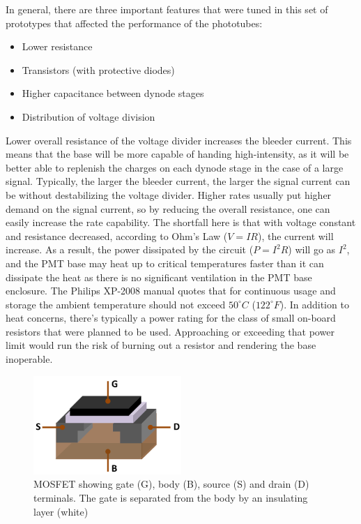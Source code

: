 In general, there are three important features that were tuned in this set of prototypes that affected the performance of the phototubes:
\begin{itemize}
	\item
	Lower resistance
	\item
	Transistors (with protective diodes)
	\item
	Higher capacitance between dynode stages
	\item
	Distribution of voltage division
\end{itemize}

Lower overall resistance of the voltage divider increases the bleeder current. This means that the base will be more capable of handing high-intensity, as it will be better able to replenish the charges on each dynode stage in the case of a large signal. Typically, the larger the bleeder current, the larger the signal current can be without destabilizing the voltage divider. Higher rates usually put higher demand on the signal current, so by reducing the overall resistance, one can easily increase the rate capability. The shortfall here is that with voltage constant and resistance decreased, according to Ohm's Law ($V = IR$), the current will increase. As a result, the power dissipated by the circuit ($P = I^2 R$) will go as $I^2$, and the PMT base may heat up to critical temperatures faster than it can dissipate the heat as there is no significant ventilation in the PMT base enclosure. The Philips XP-2008 manual quotes that for continuous usage and storage the ambient temperature should not exceed $50^\circ C$ ($122^\circ F$). In addition to heat concerns, there's typically a power rating for the class of small on-board resistors that were planned to be used. Approaching or exceeding that power limit would run the risk of burning out a resistor and rendering the base inoperable. 

\begin{figure}
	\centering
	\includegraphics[width=0.5\textwidth]{figures/MOSFET_Structure.png}
	\caption{MOSFET showing gate (G), body (B), source (S) and drain (D) terminals. The gate is separated from the body by an insulating layer (white)~\cite{wmc:mosfet}}
	\label{fig:mosfet}
\end{figure}

